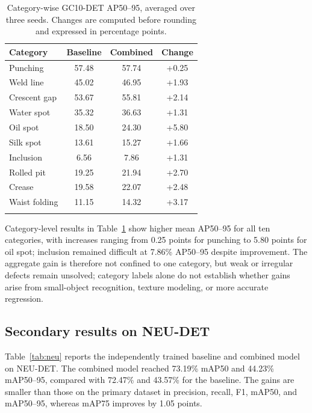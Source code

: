 \documentclass[pdflatex,sn-mathphys-num,iicol]{sn-jnl}
\begin{document}
\begin{table}[!tbp]
\centering
\caption{Category-wise GC10-DET AP50--95, averaged over three seeds. Changes are computed before rounding and expressed in percentage points.}
\label{tab:classes}
\scriptsize
\begin{tabular*}{\columnwidth}{@{\extracolsep{\fill}}lccc@{}}
\toprule
Category & Baseline & Combined & Change \\
\midrule
Punching & 57.48 & 57.74 & +0.25 \\
Weld line & 45.02 & 46.95 & +1.93 \\
Crescent gap & 53.67 & 55.81 & +2.14 \\
Water spot & 35.32 & 36.63 & +1.31 \\
Oil spot & 18.50 & 24.30 & +5.80 \\
Silk spot & 13.61 & 15.27 & +1.66 \\
Inclusion & 6.56 & 7.86 & +1.31 \\
Rolled pit & 19.25 & 21.94 & +2.70 \\
Crease & 19.58 & 22.07 & +2.48 \\
Waist folding & 11.15 & 14.32 & +3.17 \\
\botrule
\end{tabular*}
\end{table}

Category-level results in Table~\ref{tab:classes} show higher mean AP50--95 for all ten categories, with increases ranging from 0.25 points for punching to 5.80 points for oil spot; inclusion remained difficult at 7.86\% AP50--95 despite improvement. The aggregate gain is therefore not confined to one category, but weak or irregular defects remain unsolved; category labels alone do not establish whether gains arise from small-object recognition, texture modeling, or more accurate regression.

\subsection{Secondary results on NEU-DET}\label{sec:neu}

Table~\ref{tab:neu} reports the independently trained baseline and combined model on NEU-DET. The combined model reached 73.19\% mAP50 and 44.23\% mAP50--95, compared with 72.47\% and 43.57\% for the baseline. The gains are smaller than those on the primary dataset in precision, recall, F1, mAP50, and mAP50--95, whereas mAP75 improves by 1.05 points.
\end{document}
